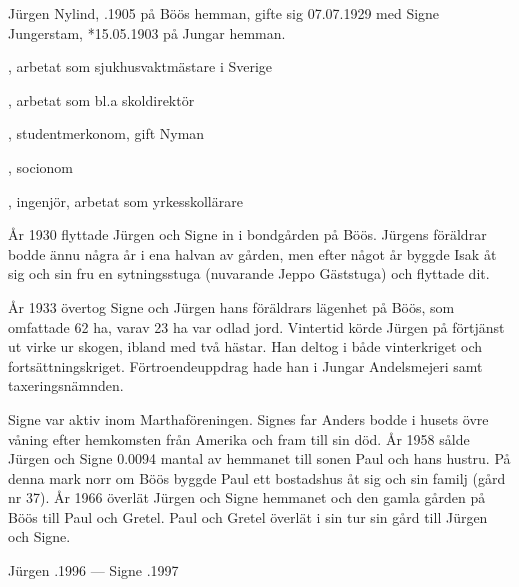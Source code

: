 %
Jürgen Nylind, .1905 på Böös hemman, gifte sig 07.07.1929 med Signe Jungerstam, *15.05.1903 på Jungar hemman.
\begin{jhchildren}
  \item {}
  \item {}, arbetat som sjukhusvaktmästare i Sverige
  \item {}, arbetat som bl.a skoldirektör
  \item {}, studentmerkonom, gift Nyman
  \item {}, socionom
  \item {}, ingenjör, arbetat som yrkesskollärare
\end{jhchildren}
År 1930 flyttade Jürgen och Signe in i bondgården på Böös. Jürgens föräldrar bodde ännu några år i ena halvan av gården, men efter något år byggde Isak åt sig och sin fru en sytningsstuga (nuvarande Jeppo Gäststuga) och flyttade dit.

År 1933 övertog Signe och Jürgen hans föräldrars lägenhet på Böös, som omfattade 62 ha, varav 23 ha var odlad jord. Vintertid körde Jürgen på förtjänst ut virke ur skogen, ibland med två hästar. Han deltog i både vinterkriget och fortsättningskriget. Förtroendeuppdrag hade han i Jungar Andelsmejeri samt taxeringsnämnden.

Signe var aktiv inom Marthaföreningen. Signes far Anders bodde i husets övre våning efter hemkomsten från Amerika och fram till sin död. År 1958 sålde Jürgen och Signe 0.0094 mantal av hemmanet till sonen Paul och hans hustru. På denna mark norr om Böös byggde Paul ett bostadshus åt sig och sin familj (gård nr 37). År 1966 överlät Jürgen och Signe hemmanet och den gamla gården på Böös till Paul och Gretel. Paul och Gretel  överlät i sin tur sin gård till Jürgen och Signe.

Jürgen .1996  ---  Signe .1997


